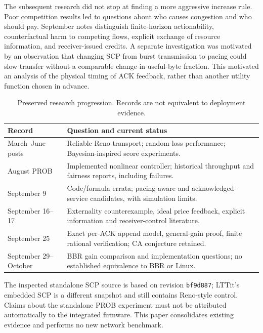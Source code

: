 \documentclass[conference,letterpaper]{IEEEtran}
\begin{document}
The subsequent research did not stop at finding a more aggressive increase rule. Poor competition results led to questions about who causes congestion and who should pay. September notes distinguish finite-horizon actionability, counterfactual harm to competing flows, explicit exchange of resource information, and receiver-issued credits. A separate investigation was motivated by an observation that changing SCP from burst transmission to pacing could slow transfer without a comparable change in useful-byte fraction. This motivated an analysis of the physical timing of ACK feedback, rather than another utility function chosen in advance.

\begin{table}[t]
\caption{Preserved research progression. Records are not equivalent to deployment evidence.}
\centering\small
\begin{tabular}{@{}>{\raggedright\arraybackslash}p{}>{\raggedright\arraybackslash}p{}@{}}
\toprule
Record & Question and current status\\\midrule
March--June posts & Reliable Reno transport; random-loss performance; Bayesian-inspired score experiments.\\
August PROB & Implemented nonlinear controller; historical throughput and fairness reports, including failures.\\
September 9 & Code/formula errata; pacing-aware and acknowledged-service candidates, with simulation limits.\\
September 16--17 & Externality counterexample, ideal price feedback, explicit information and receiver-control literature.\\
September 25 & Exact per-ACK append model, general-gain proof, finite rational verification; CA conjecture retained.\\
September 29--October & BBR gain comparison and implementation questions; no established equivalence to BBR or Linux.\\\bottomrule
\end{tabular}
\end{table}

The inspected standalone SCP source is based on revision \texttt{bf9d887}; LTTit's embedded SCP is a different snapshot and still contains Reno-style control. Claims about the standalone PROB experiment must not be attributed automatically to the integrated firmware. This paper consolidates existing evidence and performs no new network benchmark.
\end{document}
